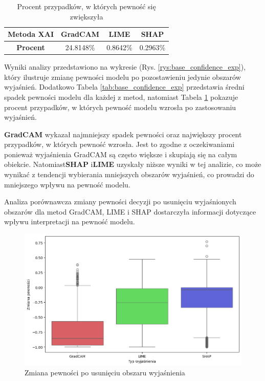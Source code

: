 \begin{table}[h]
	\centering
	\begin{tabular}{|c|c|c|c|}
		\hline
		\textbf{Metoda XAI} & \textbf{GradCAM} & \textbf{LIME} & \textbf{SHAP} \\
		\hline
		\textbf{Procent}    & 24.8148\%        & 0.8642\%      & 0.2963\%      \\
		\hline
	\end{tabular}
	\caption{Procent przypadków, w których pewność się zwiększyła}
	\label{tab:base_confidence_exp_percent}
\end{table}

Wyniki analizy przedstawiono na wykresie (Rys. \ref{rys:base_confidence_exp}), który ilustruje zmianę pewności modelu po pozostawieniu jedynie obszarów wyjaśnień.
Dodatkowo Tabela \ref{tab:base_confidence_exp} przedstawia średni spadek pewności modelu dla każdej z metod, natomiast Tabela \ref{tab:base_confidence_exp_percent} pokazuje procent przypadków, w których pewność modelu wzrosła po zastosowaniu wyjaśnień.

\textbf{GradCAM} wykazał najmniejszy spadek pewności oraz największy procent przypadków, w których pewność wzrosła.
Jest to zgodne z oczekiwaniami ponieważ wyjaśnienia GradCAM są często większe i skupiają się na całym obiekcie.
Natomiast\textbf{SHAP} i\textbf{LIME} uzyskały niższe wyniki w tej analizie, co może wynikać z tendencji wybierania mniejszych obszarów wyjaśnień, co prowadzi do mniejszego wpływu na pewność modelu.  

\vspace{1cm}

Analiza porównawcza zmiany pewności decyzji po usunięciu wyjaśnionych obszarów dla metod GradCAM, LIME i SHAP dostarczyła informacji dotyczące wpływu interpretacji na pewność modelu.

\begin{figure}[h]
	\centering\includegraphics[width=.9\textwidth]{img/base_confidence_no_exp}
	\caption{Zmiana pewności po usunięciu obszaru wyjaśnienia}  \label{rys:base_confidence_no_exp}
\end{figure}

